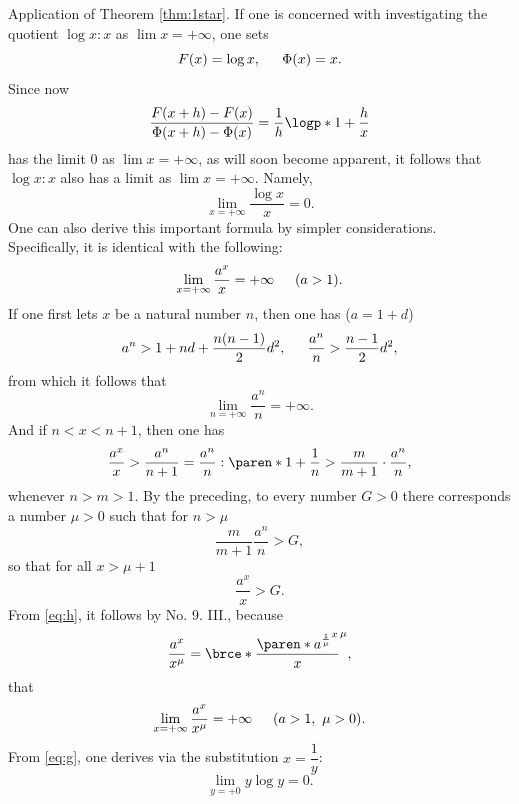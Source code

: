 \documentclass[a4paper]{amsbook}
\begin{document}
Application of Theorem \ref{thm:1star}.  If one is concerned with investigating the quotient \(\log x : x\) as \(\lim x = +\infty\), one sets
\begin{equation*}
  F(x) = \log x,
  \hspace{1.5em}
  \Phi(x) = x.
\end{equation*}
Since now
\begin{equation*}
  \frac{F(x+h) - F(x)}{\Phi(x+h) - \Phi(x)} = \frac{1}{h} \logp*{1+\frac{h}{x}}
\end{equation*}
has the limit \(0\) as \(\lim x = +\infty\), as will soon become apparent, it follows that \(\log x : x\) also has a limit as \(\lim x = +\infty\).  Namely,
\begin{equation}
  \lim_{x=+\infty} \frac{\log x}{x} = 0.
  \label{eq:g}
\end{equation}
One can also derive this important formula by simpler considerations. Specifically, it is identical with the following:
\begin{equation}
  \lim_{x=+\infty} \frac{a^x}{x} = +\infty
  \hspace{1.5em}
  (a>1).
  \label{eq:h}
\end{equation}
If one first lets \(x\) be a natural number \(n\), then one has (\(a = 1 + d\))
\begin{equation*}
  a^n > 1 + nd + \frac{n(n-1)}{2} d^2,
  \hspace{1.5em}
  \frac{a^n}{n} > \frac{n-1}{2} d^2,
\end{equation*}
from which it follows that
\begin{equation*}
  \lim_{n=+\infty} \frac{a^n}{n} = +\infty.
\end{equation*}
And if \(n < x < n + 1\), then one has
\begin{equation*}
  \frac{a^x}{x}
  > \frac{a^n}{n+1}
  = \frac{a^n}{n} : \paren*{1 + \frac{1}{n}}
  > \frac{m}{m+1} \cdot \frac{a^n}{n},
\end{equation*}
whenever \(n > m > 1\).  By the preceding, to every number \(G > 0\) there corresponds a number \(\mu > 0\) such that for \(n > \mu\)
\begin{equation*}
  \frac{m}{m+1} \frac{a^n}{n} > G,
\end{equation*}
so that for all \(x > \mu + 1\)
\begin{equation*}
  \frac{a^x}{x} > G.
\end{equation*}
From \eqref{eq:h}, it follows by No. 9. III., because
\begin{equation*}
  \frac{a^x}{x^\mu} = \brce*{\frac{\paren*{a^{\frac{1}{\mu}}}^x}{x}}^\mu,
\end{equation*}
that
\begin{equation}
  \label{eq:i}
  \lim_{x=+\infty} \frac{a^x}{x^\mu} = +\infty
  \hspace{1.5em}
  (a>1,\ \mu >0).
\end{equation}
From \eqref{eq:g}, one derives via the substitution \(x = \dfrac{1}{y}\):
\begin{equation}
  \lim_{y=+0} y \log y = 0.
  \label{eq:k}
\end{equation}
\end{document}
